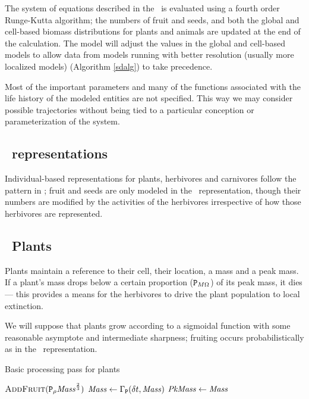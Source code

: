 
The system of equations described in the \SuppMaterial\ is evaluated
using a fourth order Runge-Kutta algorithm; the numbers of fruit and
seeds, and both the global and cell-based biomass distributions for
plants and animals are updated at the end of the calculation. The
model will adjust the values in the global and cell-based models to
allow data from models running with better resolution (usually more
localized models) (Algorithm {\ref{sdalg}}) to take precedence.

Most of the important parameters and many of the functions associated
with the life history of the modeled entities are not specified. This
way we may consider possible trajectories without being tied to a
particular conception or parameterization of the system.


\subsection*{\IB\ rep\-re\-sen\-ta\-tions}
Individual-based rep\-re\-sen\-ta\-tions for plants, herbivores and carnivores
follow the pattern in \cite{Little2006nws}; fruit and seeds are only
modeled in the \SD\ rep\-re\-sen\-ta\-tion, though their numbers are modified
by the activities of the herbivores irrespective of how those
herbivores are represented. 

\subsection{\IB\ Plants}

Plants maintain a reference to their cell, their location, a mass and
a peak mass.  If a plant's mass drops below a certain proportion
($\texttt{P}_{M\Omega}$) of its peak mass, it dies --- this provides a
means for the herbivores to drive the plant population to local
extinction. 

We will suppose that plants grow according to a sigmoidal function with
some reasonable asymptote and intermediate sharpness; fruiting
occurs probabilistically as in the \SD\ represen\-tation.

\begin{algorithm}
  \caption{Basic processing pass for plants}
  \label{plantalg}
  \begin{algorithmic}
    \State $\text{\textsc{AddFruit}}(\texttt{P}_\rho \mathit{Mass}^{\frac{2}{3}})$
    \EndIf
    \State \Die
    \Else
    \State $\mathit{Mass} \gets \Gamma_{\mathtt{P}}(\delta t, \mathit{Mass})$
    \If {$\mass > \peakmass$}
    \State $\mathit{PkMass} \gets \mathit{Mass}$
    \EndIf
    \EndIf
  \end{algorithmic}
\end{algorithm}

